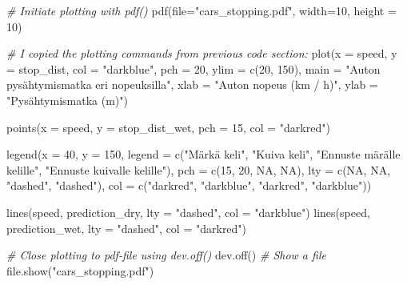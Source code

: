 \documentclass[
]{book}
\newenvironment{Shaded}{\begin{snugshade}}{\end{snugshade}}
\newcommand{\AttributeTok}[1]{\textcolor[rgb]{0.77,0.63,0.00}{#1}}
\newcommand{\CommentTok}[1]{\textcolor[rgb]{0.56,0.35,0.01}{\textit{#1}}}
\newcommand{\ConstantTok}[1]{\textcolor[rgb]{0.00,0.00,0.00}{#1}}
\newcommand{\DecValTok}[1]{\textcolor[rgb]{0.00,0.00,0.81}{#1}}
\newcommand{\FunctionTok}[1]{\textcolor[rgb]{0.00,0.00,0.00}{#1}}
\newcommand{\NormalTok}[1]{#1}
\newcommand{\StringTok}[1]{\textcolor[rgb]{0.31,0.60,0.02}{#1}}
\begin{document}
\begin{Shaded}
\begin{Highlighting}[]
\CommentTok{\# Initiate plotting with pdf()}
\FunctionTok{pdf}\NormalTok{(}\AttributeTok{file=}\StringTok{"cars\_stopping.pdf"}\NormalTok{, }\AttributeTok{width=}\DecValTok{10}\NormalTok{, }\AttributeTok{height =} \DecValTok{10}\NormalTok{)}

\CommentTok{\# I copied the plotting commands from previous code section:}
\FunctionTok{plot}\NormalTok{(}\AttributeTok{x =}\NormalTok{ speed, }\AttributeTok{y =}\NormalTok{ stop\_dist,}
     \AttributeTok{col =} \StringTok{"darkblue"}\NormalTok{, }\AttributeTok{pch =} \DecValTok{20}\NormalTok{,}
     \AttributeTok{ylim =} \FunctionTok{c}\NormalTok{(}\DecValTok{20}\NormalTok{, }\DecValTok{150}\NormalTok{),}
     \AttributeTok{main =} \StringTok{"Auton pysähtymismatka eri nopeuksilla"}\NormalTok{,}
     \AttributeTok{xlab =} \StringTok{"Auton nopeus (km / h)"}\NormalTok{, }\AttributeTok{ylab =} \StringTok{"Pysähtymismatka (m)"}\NormalTok{)}

\FunctionTok{points}\NormalTok{(}\AttributeTok{x =}\NormalTok{ speed, }\AttributeTok{y =}\NormalTok{ stop\_dist\_wet, }\AttributeTok{pch =} \DecValTok{15}\NormalTok{, }\AttributeTok{col =} \StringTok{"darkred"}\NormalTok{)}

\FunctionTok{legend}\NormalTok{(}\AttributeTok{x =} \DecValTok{40}\NormalTok{, }\AttributeTok{y =} \DecValTok{150}\NormalTok{,}
       \AttributeTok{legend =} \FunctionTok{c}\NormalTok{(}\StringTok{"Märkä keli"}\NormalTok{, }\StringTok{"Kuiva keli"}\NormalTok{,}
                  \StringTok{"Ennuste märälle kelille"}\NormalTok{,}
                  \StringTok{"Ennuste kuivalle kelille"}\NormalTok{),}
       \AttributeTok{pch =} \FunctionTok{c}\NormalTok{(}\DecValTok{15}\NormalTok{, }\DecValTok{20}\NormalTok{, }\ConstantTok{NA}\NormalTok{, }\ConstantTok{NA}\NormalTok{),}
       \AttributeTok{lty =} \FunctionTok{c}\NormalTok{(}\ConstantTok{NA}\NormalTok{, }\ConstantTok{NA}\NormalTok{, }\StringTok{"dashed"}\NormalTok{, }\StringTok{"dashed"}\NormalTok{),}
       \AttributeTok{col =} \FunctionTok{c}\NormalTok{(}\StringTok{"darkred"}\NormalTok{, }\StringTok{"darkblue"}\NormalTok{, }\StringTok{"darkred"}\NormalTok{, }\StringTok{"darkblue"}\NormalTok{))}

\FunctionTok{lines}\NormalTok{(speed, prediction\_dry, }\AttributeTok{lty =} \StringTok{"dashed"}\NormalTok{, }\AttributeTok{col =} \StringTok{"darkblue"}\NormalTok{)}
\FunctionTok{lines}\NormalTok{(speed, prediction\_wet, }\AttributeTok{lty =} \StringTok{"dashed"}\NormalTok{, }\AttributeTok{col =} \StringTok{"darkred"}\NormalTok{)}


\CommentTok{\# Close plotting to pdf{-}file using dev.off()}
\FunctionTok{dev.off}\NormalTok{()}
\CommentTok{\# Show a file}
\FunctionTok{file.show}\NormalTok{(}\StringTok{"cars\_stopping.pdf"}\NormalTok{)}
\end{Highlighting}
\end{Shaded}
\end{document}
